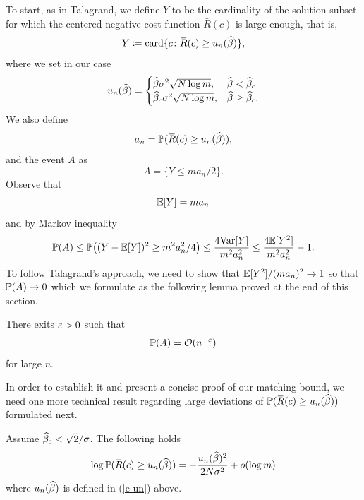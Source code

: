 To start, as in Talagrand, we define
$Y$ to be the cardinality of the solution subset for which the centered negative
cost function $\bar{R}(c)$ is large enough, that is,
\begin{equation}
  Y \coloneqq \mathrm{card}\{ c \colon \mspace{2mu}\overline{\mspace{-2mu}R\mspace{-2mu}}\mspace{2mu}(c) \ge u_n(\widehat{\beta}) \}, 
\end{equation}
where we set in our case
\begin{equation}
\label{e-un}
u_n(\widehat{\beta}) =
\begin{cases}
\widehat{\beta}\sigma^2\sqrt{N\log m}, & \widehat{\beta} < \widehat{\beta}_c\\
\widehat{\beta}_c\sigma^2\sqrt{N\log m}, & \widehat{\beta} \geq \widehat{\beta}_c.
\end{cases}
\end{equation}
We also define
\begin{equation}
a_n={\mathbb{P}}(\mspace{2mu}\overline{\mspace{-2mu}R\mspace{-2mu}}\mspace{2mu}(c)\geq u_n(\widehat{\beta})),
\end{equation}
and
the event $A$ as
$$
A=\{ Y \le ma_n/2\}.
$$
Observe that
\begin{equation}
  \mathbb{E}[Y] = ma_n
\end{equation}
and by Markov inequality 
\begin{equation}
        {\mathbb{P}}( A ) \le {\mathbb{P}}\bigl( (Y - \mathbb{E}[Y])^2 \ge m^2 a_n^2 / 4 \bigr)
\le \frac{4{\mathrm{Var}}[Y]}{m^2a_n^2} \le \frac{4 \mathbb{E}[Y^2]}{m^2a_n^2} -1.
\end{equation}
To follow Talagrand's approach, we need to show that
$\mathbb{E}[Y^2]/(ma_n)^2 \to 1$ so that ${\mathbb{P}}( A ) \to 0$
which we formulate as the following lemma proved at the end of this section.

\begin{lemma}
\label{lem-pa}
There exits $\varepsilon>0$ such that
\begin{equation}
\label{e-pa}
{\mathbb{P}}( A ) = \mathcal{O}(n^{-\varepsilon})
\end{equation}
for large $n$.
\end{lemma}

In order to establish it and present a concise proof of our matching bound,
we need one more technical result regarding large deviations of 
${\mathbb{P}}(\mspace{2mu}\overline{\mspace{-2mu}R\mspace{-2mu}}\mspace{2mu}(c)\geq u_n(\widehat{\beta}))$ formulated next.

\begin{lemma}\label{large-dev}
Assume $\widehat{\beta}_c<\sqrt{2}/\sigma$. 
The following holds
\begin{equation}
\log{\mathbb{P}}(\mspace{2mu}\overline{\mspace{-2mu}R\mspace{-2mu}}\mspace{2mu}(c)\geq u_n(\widehat{\beta})) = -\frac{u_n(\widehat{\beta})^2}{2N\sigma^2} + o(\log m)
\end{equation}
where $u_n(\widehat{\beta})$ is defined in (\ref{e-un}) above.
\end{lemma}
\parsec
